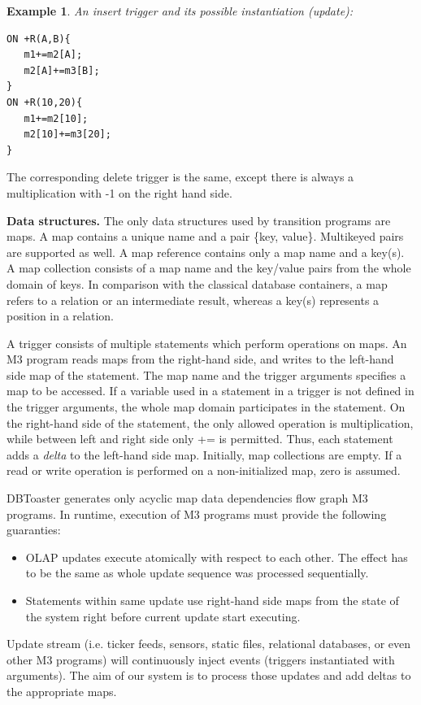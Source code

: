 \documentclass{sig-semester}
\newtheorem{example}[theorem]{Example}
\def\OLAP{OLAP\xspace}
\def\M3{M3\xspace}
\begin{document}
\begin{example} \em
\label{ex:simpleTrigger}
An insert trigger and its possible instantiation (update):
\begin{verbatim}
ON +R(A,B){
   m1+=m2[A];
   m2[A]+=m3[B];
}
ON +R(10,20){
   m1+=m2[10];
   m2[10]+=m3[20];
} 
\end{verbatim}
\end{example}
The corresponding delete trigger is the same, except there is always a multiplication with -1 on the right hand side.

\textbf{Data structures.} The only data structures used by transition programs are maps. A map contains a unique name and a pair \{key, value\}. Multikeyed pairs are supported as well. A map reference contains only a map name and a key(s). A map collection consists of a map name and the key/value pairs from the whole domain of keys. In comparison with the classical database containers, a map refers to a relation or an intermediate result, whereas a key(s) represents a position in a relation.

A trigger consists of multiple statements which perform operations on maps. An \M3 program reads maps from the right-hand side, and writes to the left-hand side map of the statement. The map name and the trigger arguments specifies a map to be accessed. If a variable used in a statement in a trigger is not defined in the trigger arguments, the whole map domain participates in the statement. On the right-hand side of the statement, the only allowed operation is multiplication, while between left and right side only += is permitted. Thus, each statement adds a \textit{delta} to the left-hand side map. Initially, map collections are empty. If a read or write operation is performed on a non-initialized map, zero is assumed.

DBToaster generates only acyclic map data dependencies flow graph \M3 programs. In runtime, execution of \M3 programs must provide the following guaranties:
\begin{itemize}
 \item \OLAP updates execute atomically with respect to each other. The effect has to be the same as whole update sequence was processed sequentially.
 \item Statements within same update use right-hand side maps from the state of the system right before current update start executing.
\end{itemize}

Update stream (i.e. ticker feeds, sensors, static files, relational databases, or even other \M3 programs) will continuously inject events (triggers instantiated with arguments). The aim of our system is to process those updates and add deltas to the appropriate maps.
\end{document}
